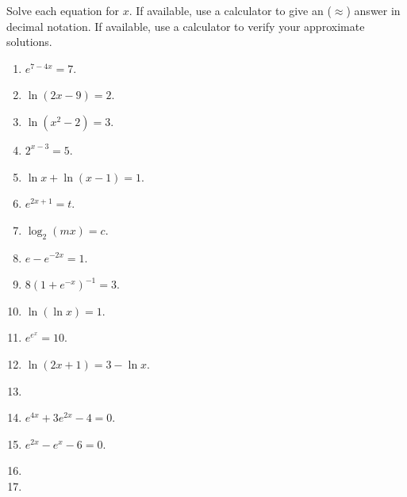 Solve each equation for $x$. If available, use a calculator to give an ($\approx$) answer in decimal notation. If available, use a calculator to verify your approximate solutions.
\begin{multicols}{2}
\begin{enumerate}[ref={\fcProblemRef}]
\item $e^{7-4x}=7$.

\item $\ln (2x-9)=2$.

\item $\ln (x^2-2)=3$.

\item  \label{problem2^(x-3)=5} $2^{x-3}=5$.

\item \label{problemlnx+ln(x-1)=1} $\ln x+\ln (x-1)=1$.

\item $e^{2x+1}=t$.

\item $\log_2(m x)=c$.

\item \label{probleme-e^(-2x)=1} $e- e^{-2x}=1$.

\item $8(1+e^{-x})^{-1}=3$.

\item $\ln (\ln x)=1$.

\item $e^{e^x}=10$.

\item $\ln(2x+1)=3-\ln x$.

\item 
\item $e^{4x}+3e^{2x}-4=0$. 

\item $e^{2x}-e^x-6=0$.

\item 


\item 


\end{enumerate}
\end{multicols}

